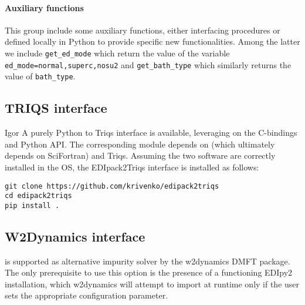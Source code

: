 \documentclass[edipack2.tex]{subfiles}
\begin{document}
\paragraph{{\bf Auxiliary functions}}
This group include some auxiliary functions, either interfacing \NAME
procedures or defined locally in Python to provide specific new
functionalities. Among the latter we include {\tt get\_ed\_mode} which
return the value of the variable {\tt ed\_mode=normal,superc,nosu2}
and {\tt get\_bath\_type} which similarly returns the value of {\tt bath\_type}.









\subsection{TRIQS interface}\label{sSecInteropTRIQS}
{\color{red} Igor }
A purely Python \NAME to Triqs interface is available, leveraging on
the C-bindings and Python API. The corresponding module depends on
\NAME (which ultimately depends on SciFortran) and Triqs.
Assuming the two software are correctly installed in the OS, the
EDIpack2Triqs interface is installed as follows:

\begin{lstlisting}[style=mybash]
git clone https://github.com/krivenko/edipack2triqs
cd edipack2triqs
pip install .
\end{lstlisting}



\subsection{W2Dynamics interface}\label{sSecInteropW2DYN}
\NAME is supported as alternative impurity solver by the w2dynamics DMFT package\cite{Wallerberger2019CPC}. The only prerequisite to use this option is the presence of a functioning EDIpy2 installation, which w2dynamics will attempt to import at runtime only if the user sets the appropriate configuration parameter.
\end{document}
